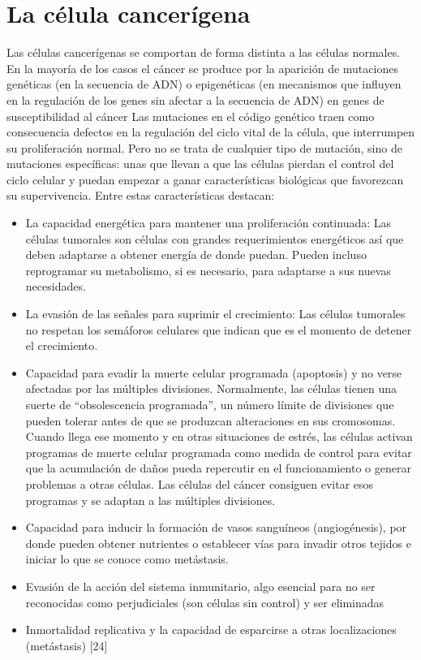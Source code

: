 \section{La célula cancerígena}
\hspace{.1cm}Las células cancerígenas se comportan de forma distinta a las células normales. En la mayoría de los casos el cáncer se produce por la aparición de mutaciones genéticas (en la secuencia de ADN) o epigenéticas (en mecanismos que influyen en la regulación de los genes sin afectar a la secuencia de ADN) en genes de susceptibilidad al cáncer Las mutaciones en el código genético traen como consecuencia defectos en la regulación del ciclo vital de la célula, que interrumpen su proliferación normal. Pero no se trata de cualquier tipo de mutación, sino de mutaciones específicas: unas que llevan a que las células pierdan el control del ciclo celular y puedan empezar a ganar características biológicas que favorezcan su supervivencia.
Entre estas características destacan:
\begin{itemize}
    \item La capacidad energética para mantener una proliferación continuada: Las células tumorales son células con grandes requerimientos energéticos así que deben adaptarse a obtener energía de donde puedan. Pueden incluso reprogramar su metabolismo, si es necesario, para adaptarse a sus nuevas necesidades.
    \item La evasión de las señales para suprimir el crecimiento: Las células tumorales no respetan los semáforos celulares que indican que es el momento de detener el crecimiento.
    \item Capacidad para evadir la muerte celular programada (apoptosis) y no verse afectadas por las múltiples divisiones. Normalmente, las células tienen una suerte de “obsolescencia programada”, un número límite de divisiones que pueden tolerar antes de que se produzcan alteraciones en sus cromosomas. Cuando llega ese momento y en otras situaciones de estrés, las células activan programas de muerte celular programada como medida de control para evitar que la acumulación de daños pueda repercutir en el funcionamiento o generar problemas a otras células. Las células del cáncer consiguen evitar esos programas y se adaptan a las múltiples divisiones.
    \item Capacidad para inducir la formación de vasos sanguíneos (angiogénesis), por donde pueden obtener nutrientes o establecer vías para invadir otros tejidos e iniciar lo que se conoce como metástasis.
    \item Evasión de la acción del sistema inmunitario, algo esencial para no ser reconocidas como perjudiciales (son células sin control) y ser eliminadas
    \item Inmortalidad replicativa y la capacidad de esparcirse a otras localizaciones (metástasis) [24]
\end{itemize}

